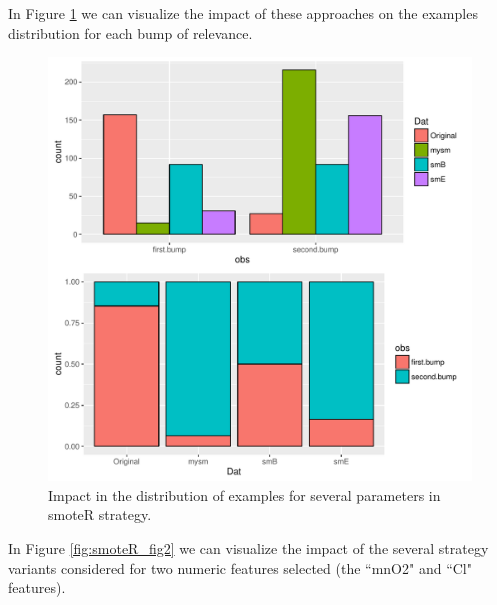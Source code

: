 \documentclass[10pt,a4paper]{article}\usepackage[]{graphicx}\usepackage[]{color}
\makeatletter
\def\maxwidth{ %
  \ifdim\Gin@nat@width>\linewidth
    \linewidth
  \else
    \Gin@nat@width
  \fi
}
\newenvironment{knitrout}{}{} %
\makeatother
\begin{document}
In Figure \ref{fig:smoteR_1bar} we can visualize the impact of these approaches on the examples distribution for each bump of relevance.

\begin{knitrout}\footnotesize
{}\color{fgcolor}\begin{figure}

{\centering \includegraphics[width=\maxwidth,height=0.5\textheight]{figures/UBL-smoteR_1bar-1} 

}

\caption[Impact in the distribution of examples for several parameters in smoteR strategy]{Impact in the distribution of examples for several parameters in smoteR strategy. }\label{fig:smoteR_1bar}
\end{figure}


\end{knitrout}

In Figure \ref{fig:smoteR_fig2} we can visualize the impact of the several strategy variants considered for two numeric features selected (the ``mnO2" and ``Cl" features).
\end{document}

